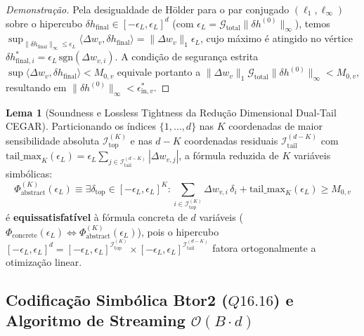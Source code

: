 \documentclass[11pt,a4paper]{article}
\theoremstyle{definition}
\newtheorem{lemma}{Lema}
\begin{document}
\begin{proof}[Demonstração]
Pela desigualdade de Hölder para o par conjugado $(\ell_1, \ell_\infty)$ sobre o hipercubo $\delta h_{\text{final}} \in [-\epsilon_L, \epsilon_L]^d$ (com $\epsilon_L = \mathcal{G}_{\text{total}}\|\delta h^{(0)}\|_\infty$), temos $\sup_{\|\delta h_{\text{final}}\|_\infty \le \epsilon_L} \langle \Delta w_v, \delta h_{\text{final}} \rangle = \|\Delta w_v\|_1 \epsilon_L$, cujo máximo é atingido no vértice $\delta h_{\text{final},i}^* = \epsilon_L\,\text{sgn}(\Delta w_{v,i})$. A condição de segurança estrita $\sup \langle \Delta w_v, \delta h_{\text{final}} \rangle < M_{0,v}$ equivale portanto a $\|\Delta w_v\|_1 \mathcal{G}_{\text{total}} \|\delta h^{(0)}\|_\infty < M_{0,v}$, resultando em $\|\delta h^{(0)}\|_\infty < \epsilon_{\text{in},v}^*$.
\end{proof}

\begin{lemma}[Soundness e Lossless Tightness da Redução Dimensional Dual-Tail CEGAR]
\label{lem:cegar_dualtail}
Particionando os índices $\{1, \dots, d\}$ nas $K$ coordenadas de maior sensibilidade absoluta $\mathcal{I}_{\text{top}}^{(K)}$ e nas $d-K$ coordenadas residuais $\mathcal{I}_{\text{tail}}^{(d-K)}$ com $\mathrm{tail\_max}_K(\epsilon_L) = \epsilon_L \sum_{j \in \mathcal{I}_{\text{tail}}^{(d-K)}} |\Delta w_{v,j}|$, a fórmula reduzida de $K$ variáveis simbólicas:
\begin{equation}
    \Phi_{\text{abstract}}^{(K)}(\epsilon_L) \equiv \exists \delta_{\text{top}} \in [-\epsilon_L, \epsilon_L]^K : \sum_{i \in \mathcal{I}_{\text{top}}^{(K)}} \Delta w_{v,i}\,\delta_i + \mathrm{tail\_max}_K(\epsilon_L) \ge M_{0,v}
\end{equation}
é \textbf{equissatisfatível} à fórmula concreta de $d$ variáveis ($\Phi_{\text{concrete}}(\epsilon_L) \iff \Phi_{\text{abstract}}^{(K)}(\epsilon_L)$), pois o hipercubo $[-\epsilon_L, \epsilon_L]^d = [-\epsilon_L, \epsilon_L]^{\mathcal{I}_{\text{top}}^{(K)}} \times [-\epsilon_L, \epsilon_L]^{\mathcal{I}_{\text{tail}}^{(d-K)}}$ fatora ortogonalmente a otimização linear.
\end{lemma}

\subsection{Codificação Simbólica Btor2 (\texorpdfstring{$Q16.16$}{Q16.16}) e Algoritmo de Streaming \texorpdfstring{$\mathcal{O}(B \cdot d)$}{O(B d)}}
\end{document}
